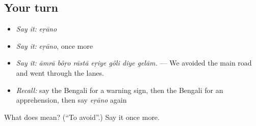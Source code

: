 \subsection*{Your turn}
\begin{itemize}
\raggedright
  \item \emph{Say it:} \emph{eṛāno}
  \item \emph{Say it:} \emph{eṛāno}, once more
  \item \emph{Say it:} \emph{āmrā bôṛo rāstā eṛiye gôli diye gelām.} — We avoided the main road and went through the lanes.
  \item \emph{Recall:} say the Bengali for a warning sign, then the Bengali for an apprehension, then say \emph{eṛāno} again
\end{itemize}

\begin{tcolorbox}[breakable,colback=teal!4,colframe=teal!35!black,title={Before you move on}]
What does  mean? (\textquotedblleft{}To avoid\textquotedblright{}.) Say it once more.
\end{tcolorbox}
